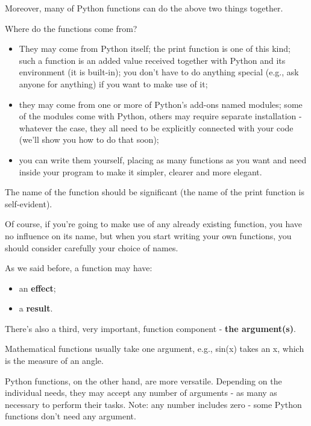 \documentclass[a4paper,10pt]{article}
\begin{document}
Moreover, many of Python functions can do the above two things together.
\newline

Where do the functions come from?
\begin{itemize}
 \item They may come from Python itself; the print function is one of this kind; such a function is an added value received together with Python and its environment (it is built-in); you don't have to do anything special (e.g., ask anyone for anything) if you want to make use of it;
 \item they may come from one or more of Python's add-ons named modules; some of the modules come with Python, others may require separate installation - whatever the case, they all need to be explicitly connected with your code (we'll show you how to do that soon);
 \item you can write them yourself, placing as many functions as you want and need inside your program to make it simpler, clearer and more elegant.
\end{itemize}

The name of the function should be significant (the name of the print function is self-evident).
\newline

Of course, if you're going to make use of any already existing function, you have no influence on its name, but when you start writing your own functions, you should consider carefully your choice of names.
\newline

As we said before, a function may have:
\begin{itemize}
 \item an \textbf{effect};
 \item a \textbf{result}.
\end{itemize}

There's also a third, very important, function component - \textbf{the argument(s)}.
\newline

Mathematical functions usually take one argument, e.g., sin(x) takes an x, which is the measure of an angle.
\newline

Python functions, on the other hand, are more versatile. Depending on the individual needs, they may accept any number of arguments - as many as necessary to perform their tasks. Note: any number includes zero - some Python functions don't need any argument.
\newline
\end{document}
